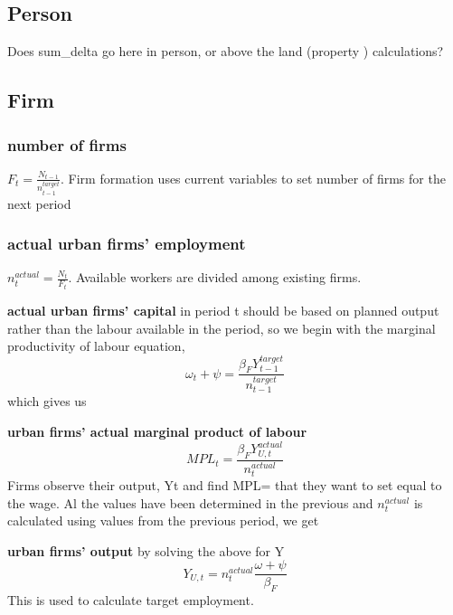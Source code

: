 \subsection{Person}
Does sum\_delta go here in person, or above the land (property ) calculations?  

\subsection{Firm}

\subsubsection{number of firms} $F_{t}=\frac{N_{t-1}}{n^{target}_{t-1}}$. Firm formation uses current variables to set number of firms for the next period 

\subsubsection{actual urban firms' employment} 
$n_t^{actual}= \frac{N_t}{F_t} $. Available workers are divided among existing firms.   


\textbf{actual urban firms' capital} in period t should be based on planned output rather than the labour available in the period, so we begin with the marginal productivity of labour equation, \[\omega_{t}+\psi = \frac{\beta_{F}Y^{target}_{t-1}}{n_{t-1}^{target}}\]
which gives us 


\textbf{urban firms' actual marginal product of labour}
\[MPL_{t} = \frac{\beta_{F}Y^{actual}_{U,t}}{n_t^{actual}}\] \noindent Firms observe their output, Yt and find  MPL= that they want to set equal to the wage. Al the values have been determined in the previous  and $n^{actual}_t$ is calculated using values from the  previous period, we get

\textbf{urban firms' output} by solving the above for Y
\[Y_{U,t}=  n_t^{actual}\frac{\omega+\psi}{\beta_{F}} \] 
This is used to calculate target employment.


